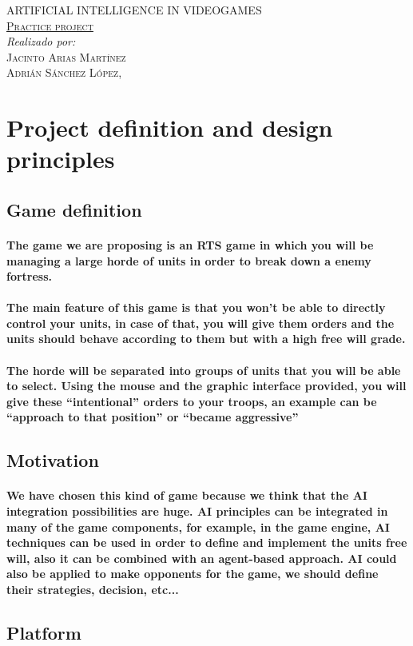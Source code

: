 \documentclass[a4paper,10pt]{article}
\newcommand{\titulo}[2]{ \begin{titlepage}\begin{center}\vspace*{\fill}\textsc{\Huge #1}\\[5cm]\textsc{\Large \underline{#2}}\\[5cm]\emph{Realizado por:}\\ \textsc{Jacinto Arias Martínez}\\ \textsc{Adrián Sánchez López}\vspace*{\fill}\vfill\monthname[\the\month],\, \the\year\end{center}\end{titlepage}}
\newcommand{\p}[1]{\paragraph{\indent\textnormal{#1}}}
\begin{document}
 \titulo{ARTIFICIAL INTELLIGENCE IN VIDEOGAMES}{Practice project}

    \begin{abstract}
    
    \end{abstract}

  \newpage

  \vspace*{3cm}
  \tableofcontents
  \vspace*{\fill}

\newpage
\section{Project definition and design principles}

  \subsection{Game definition}

    \p{The game we are proposing is an RTS game in which you will be managing a large horde of units in order to break down a enemy fortress.}

    \p{The main feature of this game is that you won't be able to directly control your units, in case of that, you will give them orders and the units should behave according to them but with a high free will grade.}

    \p{The horde will be separated into groups of units that you will be able to select. Using the mouse and the graphic interface provided, you will give these ``intentional'' orders to your troops, an example can be ``approach to that position'' or ``became aggressive''}


  \subsection{Motivation}

    \p{We have chosen this kind of game because we think that the AI integration possibilities are huge. AI principles can be integrated in many of the game components, for example, in the game engine, AI techniques can be used in order to define and implement the units free will, also it can be combined with an agent-based approach. AI could also be applied to make opponents for the game, we should define their strategies, decision, etc...}


  \subsection{Platform}
\end{document}
